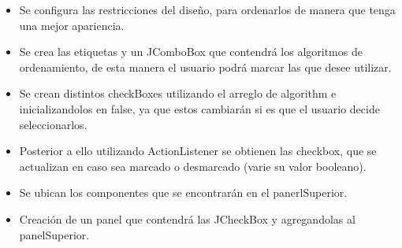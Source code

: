 \documentclass{article}
\begin{document}
    \begin{itemize}
        \begin{itemize}
            \item Se configura las restricciones del diseño, para ordenarlos de manera que tenga una mejor apariencia.
        \end{itemize}
    \end{itemize}
    

    \begin{itemize}
        \begin{itemize}
            \item Se crea las etiquetas y un JComboBox que contendrá los algoritmos de ordenamiento, de esta manera el usuario podrá marcar las que desee utilizar.
        \end{itemize}
    \end{itemize}
    

    \begin{itemize}
        \begin{itemize}
            \item Se crean distintos checkBoxes utilizando el arreglo de algorithm e inicializandolos en false, ya que estos cambiarán si es que el usuario decide seleccionarlos.
            \item Posterior a ello utilizando ActionListener se obtienen las checkbox, que se actualizan en caso sea marcado o desmarcado (varie su valor booleano).
        \end{itemize}
    \end{itemize}
    

    \begin{itemize}
        \begin{itemize}
            \item Se ubican los componentes que se encontrarán en el panerlSuperior.
        \end{itemize}
    \end{itemize}
    

    \begin{itemize}
        \begin{itemize}
            \item Creación de un panel que contendrá las JCheckBox y agregandolas al panelSuperior.
        \end{itemize}
    \end{itemize}
    
\end{document}

